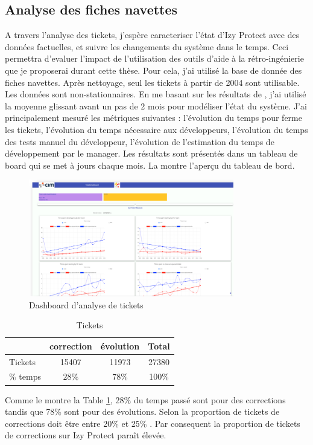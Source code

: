 \documentclass[a4paper]{article}
\begin{document}
\subsection{Analyse des fiches navettes}
\label{sec:analyseDesFichesNavettes}
A travers l'analyse des tickets, j'espère  caracteriser l'état d'Izy Protect avec des données factuelles, 
et suivre  les changements du système dans le temps.
Ceci permettra  d'evaluer l'impact de l'utilisation des outils d'aide à la rétro-ingénierie que je proposerai durant cette thèse.
Pour cela, j'ai utilisé la base de donnée des fiches navettes. 
Après nettoyage, seul les tickets à partir de 2004 sont utilisable. 
Les données sont non-stationnaires. 
En me basant sur les résultats de \cite{Raja09}, j'ai utilisé la moyenne glissant avant un pas de 2 mois pour modéliser l'état du système.
J'ai principalement mesuré les métriques suivantes : l'évolution du temps pour ferme les tickets, l'évolution du temps nécessaire aux développeurs, l'évolution du temps des tests manuel du développeur, l'évolution de l'estimation du temps de développement par le manager.
Les résultats sont présentés dans un tableau de board qui se met à jours chaque mois.
La  montre l'aperçu du tableau de bord.
\begin{figure}[htbp]
  \begin{center}
  \includegraphics[width=0.8\textwidth]{./figures/dashboard.png}
  \caption{Dashboard d'analyse de tickets}
  \label{fig:dashboardFig}
\end{center}
\vspace{-0.3cm}
\end{figure}


\begin{table}[htbp]
  \begin{center}
    \caption{Tickets}
    \label{tab:proportion}
    \begin{tabular}{| l | c |c|c|}
      \hline
       & correction  & évolution  & Total\\
      \hline
      Tickets &15407 & 11973  & 27380\\
      \hline
      $\%$ temps & $28\%$ & $78\%$ & 100\% \\
      \hline 
    \end{tabular}
  \end{center}  
\end{table}
Comme le montre la Table \ref{tab:proportion}, 28\% du temps passé sont pour des corrections tandis que 78\% sont  pour des évolutions.
Selon \citet{Pigo96a} la proportion de tickets de corrections doit être entre 20\% et 25\% . 
Par consequent la proportion de tickets de corrections sur Izy Protect paraît élevée.
\end{document}
